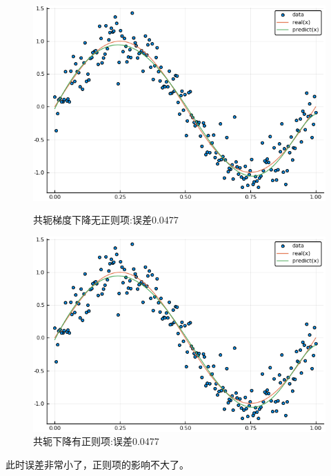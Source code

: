\documentclass{ML}
\begin{document}
\begin{figure}[H]
	\begin{minipage}[c]{0.5\linewidth}
		\centering
		\includegraphics[width=0.9\linewidth]{media/200/ConjugationNoLambda}
		\caption{共轭梯度下降无正则项:误差0.0477} %
		\label{fig:connolambda200}
	\end{minipage}
	\begin{minipage}[c]{0.5\linewidth}
		\centering
		\includegraphics[width=0.9\linewidth]{media/200/ConjugationWithLambda}
		\caption{共轭下降有正则项:误差0.0477} %
		\label{fig:conwithlambda200}
	\end{minipage}
\end{figure}

此时误差非常小了，正则项的影响不大了。

\end{document}
